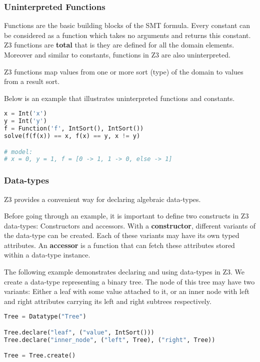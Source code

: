 \subsubsection{Uninterpreted Functions}
Functions are the basic building blocks of the SMT formula. Every constant can be considered as a function which takes no arguments and returns this constant.
Z3 functions are \textbf{total} that is they are defined for all the domain elements. Moreover and similar to constants, functions in Z3 are also uninterpreted.

Z3 functions map values from one or more sort (type) of the domain to values from a result sort.

Below is an example that illustrates uninterpreted functions and constants.

\begin{lstlisting}[language=python]
x = Int('x')
y = Int('y')
f = Function('f', IntSort(), IntSort())
solve(f(f(x)) == x, f(x) == y, x != y)

# model:
# x = 0, y = 1, f = [0 -> 1, 1 -> 0, else -> 1]
\end{lstlisting}

\subsubsection{Data-types}
Z3 provides a convenient way for declaring algebraic data-types.

Before going through an example, it is important to define two constructs in Z3 data-types: Constructors and accessors. With a \textbf{constructor}, different variants of the data-type can be created. Each of these variants may have its own typed attributes. An \textbf{accessor} is a function that can fetch these attributes stored within a data-type instance.

The following example demonstrates declaring and using data-types in Z3. We create a data-type representing a binary tree. The node of this tree may have two variants: Either a leaf with some value attached to it, or an inner node with left and right attributes carrying its left and right subtrees respectively.

\begin{lstlisting}[language=python]
Tree = Datatype("Tree")

Tree.declare("leaf", ("value", IntSort()))
Tree.declare("inner_node", ("left", Tree), ("right", Tree))

Tree = Tree.create()
\end{lstlisting}

